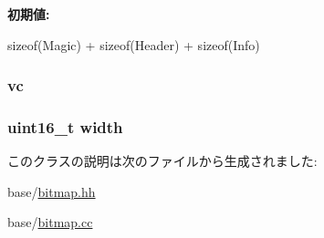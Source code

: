 \label{classBitmap_aa659ac1e8f41fbbeff951253e434390f}
{\bfseries 初期値:}
\begin{DoxyCode}
 sizeof(Magic) + sizeof(Header) +
                                        sizeof(Info)
\end{DoxyCode}
\hypertarget{classBitmap_ae8e736e4fe6c1de602b7f4ac03d7d7a7}{
\subsubsection[{vc}]{ {\bf vc}}}
\label{classBitmap_ae8e736e4fe6c1de602b7f4ac03d7d7a7}
\hypertarget{classBitmap_ad0eab1042455a2067c812ab8071d5376}{
\subsubsection[{width}]{\setlength{\rightskip}{0pt plus 5cm}uint16\_\-t {\bf width}}}
\label{classBitmap_ad0eab1042455a2067c812ab8071d5376}


このクラスの説明は次のファイルから生成されました:\begin{DoxyCompactItemize}
\item 
base/\hyperlink{bitmap_8hh}{bitmap.hh}\item 
base/\hyperlink{bitmap_8cc}{bitmap.cc}\end{DoxyCompactItemize}
